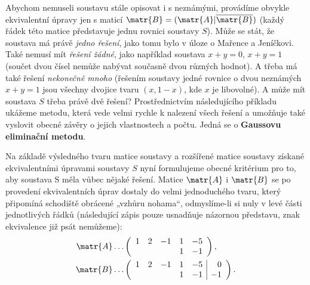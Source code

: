       Abychom nemuseli soustavu stále opisovat i s neznámými, provádíme obvykle ekvivalentní úpravy
      jen s maticí \(\matr{B} = (\matr{A}\vert\overline{\matr{B}})\) (každý řádek této matice
      představuje jednu rovnici soustavy \(S\)). Může se stát, že soustava má právě \emph{jedno
      řešení}, jako tomu bylo v  úloze o Mařence a Jeníčkovi. Také nemusí mít \emph{řešení žádné},
      jako například soustava \(x + y = 0\), \(x + y = 1\) (součet dvou čísel nemůže nabývat
      současně dvou různých hodnot). A třeba má také řešení \emph{nekonečně mnoho} (řešením soustavy
      jedné rovnice o dvou neznámých \(x + y = 1\) jsou všechny dvojice tvaru \((x, 1 - x)\), kde
      \(x\) je libovolné). A může mít soustava \(S\) třeba právě dvě řešení? Prostřednictvím
      následujícího příkladu ukážeme metodu, která vede velmi rychle k nalezení všech řešení a
      umožňuje také vyslovit obecné závěry o jejich vlastnostech a počtu. Jedná se o
      \textbf{Gaussovu eliminační metodu}.

      

      Na základě výsledného tvaru matice soustavy a rozšířené matice soustavy získané ekvivalentními
      úpravami soustavy \(S\) nyní formulujeme obecné kritérium pro to, aby soustava S měla vůbec
      nějaké řešení. Matice \(\matr{A}\) i \(\matr{B}\) se po provedení ekvivalentních úprav dostaly
      do velmi jednoduchého tvaru, který připomíná schodiště obrácené „vzhůru nohama“, odmyslíme-li
      si nuly v levé části jednotlivých řádků (následující zápis pouze usnadňuje názornou představu,
      znak ekvivalence již psát nemůžeme):
      \begingroup
        \renewcommand\arraystretch{0.9}
        \renewcommand\arraycolsep{3pt}
        \begin{align*}
          \matr{A} &\ldots
          \left(
            \begin{array}{rrrrr}
                    1 &  2 & -1 & 1      & -5     \\
                      &    &    & 1      & -1 
            \end{array}
          \right),  \\
          \matr{B} &\ldots
          \left(
            \begin{array}{rrrrr|r}
                    1 &  2 & -1 & 1      & -5 &  0    \\
                      &    &    & 1      & -1 & -1
            \end{array}
          \right).
        \end{align*}
      \endgroup

